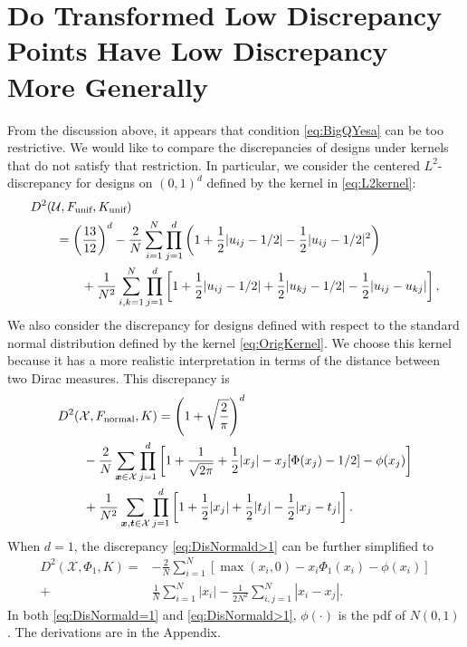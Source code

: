 \documentclass[graybox]{svmult}
\newcommand{\vx}{\boldsymbol{x}}
\newcommand{\vt}{\boldsymbol{t}}
\newcommand{\Udes}{\mathcal{U}}
\newcommand{\Xdes}{\mathcal{X}}
\newcommand{\unif}{\textup{unif}}
\newcommand{\normal}{\textup{normal}}
\begin{document}
\section{Do Transformed Low Discrepancy Points Have Low Discrepancy More Generally}

From the discussion above, it appears that condition \eqref{eq:BigQYesa} can be too restrictive.  We would like to compare the discrepancies of designs under kernels that do not satisfy that restriction.  In particular, we consider the centered $L^2$-discrepancy for designs on $(0,1)^d$ defined by the kernel in \eqref{eq:L2kernel}:
\begin{align*}
\MoveEqLeft{D^2(\Udes, F_\unif, K_\unif)} \\
& = \left(\frac{13}{12}\right)^d - \frac{2}{N}\sum_{i=1}^N \prod_{j=1}^d \left(1+\frac{1}{2}|u_{ij}-1/2|-\frac12|u_{ij}-1/2|^2\right)\\
& \qquad + \frac{1}{N^2}\sum_{i,k=1}^N\prod_{j=1}^d\left[1+\frac{1}{2}|u_{ij}-1/2|+\frac{1}{2}|u_{kj}-1/2|-\frac{1}{2}|u_{ij}-u_{kj}|\right],    
\end{align*}
We also consider the discrepancy for designs defined with respect to the standard normal distribution defined by the kernel \eqref{eq:OrigKernel}.  We choose this kernel because it has a more realistic interpretation in terms of the distance between two Dirac measures.  This discrepancy is 
\begin{align}\label{eq:DisNormald>1}
\nonumber
\MoveEqLeft{D^2(\Xdes, F_\normal, K) = \left(1+\sqrt{\frac{2}{\pi}}\right)^d}\\
\nonumber
  & - \frac{2}{N}\sum\limits_{\vx\in \Xdes} \prod\limits_{j=1}^d\left[ 1+\frac{1}{\sqrt{2\pi}}+\frac{1}{2}|x_j|-x_j[\Phi(x_j)-1/2]-\phi(x_j)\right]\\
  &+\frac{1}{N^2}\sum_{\vx,\vt\in \Xdes}\prod_{j=1}^d \left[1+\frac{1}{2}|x_j|+\frac{1}{2}|t_j|-\frac{1}{2}|x_j-t_j|\right]. 
\end{align}
When $d=1$, the discrepancy \eqref{eq:DisNormald>1} can be further simplified to
\begin{align}\label{eq:DisNormald=1}\nonumber
D^2(\Xdes, \Phi_1, K)=& -\frac{2}{N}\sum_{i=1}^N \left[\max(x_i,0)-x_i\Phi_1(x_i)-\phi(x_i)\right]\\
+&\frac{1}{N}\sum_{i=1}^N|x_i|-\frac{1}{2N^2}\sum_{i,j=1}^N|x_i-x_j|. 
\end{align}
In both \eqref{eq:DisNormald=1} and \eqref{eq:DisNormald>1}, $\phi(\cdot)$ is the pdf of $N(0,1)$. 
The derivations are in the Appendix. 
\end{document}
